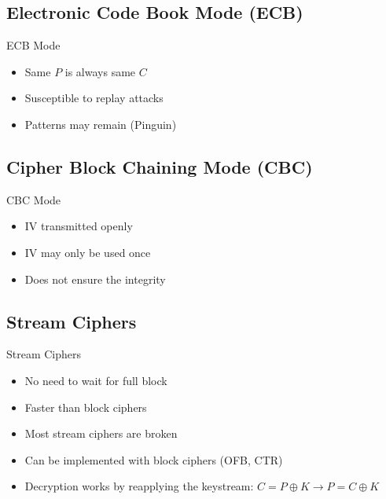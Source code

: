 \subsection{Electronic Code Book Mode (ECB)}

\begin{definition}{ECB Mode}\\
    \begin{itemize}
        \item Same $P$ is always same $C$
        \item Susceptible to replay attacks
        \item Patterns may remain (Pinguin)
    \end{itemize}
\end{definition}


\subsection{Cipher Block Chaining Mode (CBC)}

\begin{concept}{CBC Mode}\\
    \begin{itemize}
        \item IV transmitted openly
        \item IV may only be used once
        \item Does not ensure the integrity
    \end{itemize}
\end{concept}


\subsection{Stream Ciphers}

\begin{definition}{Stream Ciphers}\\
    \begin{itemize}
        \item No need to wait for full block
        \item Faster than block ciphers
        \item Most stream ciphers are broken
        \item Can be implemented with block ciphers (OFB, CTR)
        \item Decryption works by reapplying the keystream: $C = P \oplus K \rightarrow P = C \oplus K$
    \end{itemize}
\end{definition}

